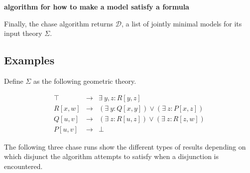 		\textbf{algorithm for how to make a model satisfy a formula}

		Finally, the chase algorithm returns $\mathcal{D}$, a list of jointly
		minimal models for its input theory $\Sigma$.

	\subsection{Examples}

		Define $\Sigma$ as the following geometric theory.

		\begin{eqnarray}
			\top    &  \to  &  \exists\ y,z : R[y,z]                             \\
			R[x,w]  &  \to  &  (\exists\ y : Q[x,y]) \vee (\exists\ z : P[x,z])  \\
			Q[u,v]  &  \to  &  (\exists\ z : R[u,z]) \vee (\exists\ z : R[z,w])  \\
			P[u,v]  &  \to  &  \bot
		\end{eqnarray}

		The following three chase runs show the different types of results
		depending on which disjunct the algorithm attempts to satisfy when a
		disjunction is encountered.

